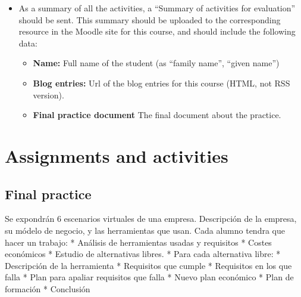 \documentclass[a4paper]{article}
\begin{document}
\begin{itemize}
\item As a summary of all the activities, a ``Summary of activities for evaluation'' should be sent. This summary should be uploaded to the corresponding resource in the Moodle site for this course, and should include the following data:
  \begin{itemize}
  \item \textbf{Name:} Full name of the student (as ``family name'', ``given name'')
  \item \textbf{Blog entries:} Url of the blog entries for this course (HTML, not RSS version).
  \item \textbf{Final practice document} The final document about the practice.  
  \end{itemize}
\end{itemize}

\section{Assignments and activities}

\subsection{Final practice}


Se expondrán 6 escenarios virtuales de una empresa. Descripción de la empresa, su módelo de negocio, y las herramientas que usan. Cada alumno tendra que hacer un trabajo:
 * Análisis de herramientas usadas y requisitos
 * Costes económicos 
 * Estudio de alternativas libres.
 * Para cada alternativa libre:
    * Descripción de la herramienta
    * Requisitos que cumple
    * Requisitos en los que falla
    * Plan para apaliar requisitos que falla
 * Nuevo plan económico
 * Plan de formación
 * Conclusión



\end{document}
